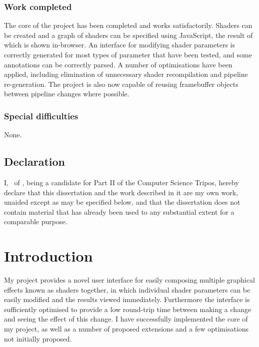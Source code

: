 \documentclass[12pt,twoside,notitlepage]{report}
\begin{document}
\subsection*{Work completed}
The core of the project has been completed and works satisfactorily. Shaders can be created and a graph of shaders can be specified using JavaScript, the result of which is shown in-browser. An interface for modifying shader parameters is correctly generated for most types of parameter that have been tested, and some annotations can be correctly parsed. A number of optimisations have been applied, including elimination of unnecessary shader recompilation and pipeline re-generation. The project is also now capable of reusing framebuffer objects between pipeline changes where possible.

\subsection*{Special difficulties}
None.
 
\newpage
\setlength{\parskip}{9pt}
\section*{Declaration}

I, \name \ of \college, being a candidate for Part II of the Computer
Science Tripos, hereby declare
that this dissertation and the work described in it are my own work,
unaided except as may be specified below, and that the dissertation
does not contain material that has already been used to any substantial
extent for a comparable purpose.

\bigskip
{}

\medskip
{}

\cleardoublepage

\tableofcontents


\cleardoublepage        %


\chapter{Introduction}
My project provides a novel user interface for easily composing multiple graphical effects known as shaders together, in which individual shader parameters can be easily modified and the results viewed immediately. Furthermore the interface is sufficiently optimised to provide a low round-trip time between making a change and seeing the effect of this change. I have successfully implemented the core of my project, as well as a number of proposed extensions and a few optimisations not initially proposed.
\end{document}
